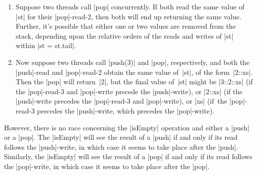 \begin{answerS}
\begin{enumerate}
\item Suppose two threads call |pop| concurrently.  If both read the same
  value of |st| for their |pop|-read-2,  then both will end up
  returning the same value.  Further, it's possible that either one or two
  values are removed from the stack, depending upon the relative orders of the
  reads and writes of |st| within |st = st.tail|.  

\item Now suppose two threads call |push(3)| and |pop|, respectively, and both
  the |push|-read and |pop|-read-2 obtain the same value of~|st|, of the
  form~|2::xs|.  Then the |pop| will return~|2|, but the final value of~|st|
  might be |3::2::xs| (if the |pop|-read-3 and |pop|-write precede the
  |push|-write), or |2::xs| (if the |push|-write precedes the |pop|-read-3 and
  |pop|-write), or |xs| (if~the |pop|-read-3 precedes the |push|-write, which
  precedes the |pop|-write).
\end{enumerate}

However, there is no race concerning the |isEmpty| operation and either a
|push| or a |pop|.  The |isEmpty| will see the result of a |push| if and only
if its read follows the |push|-write, in which case it seems to take place
after the |push|.  Similarly, the |isEmpty| will see the result of a |pop| if
and only if its read follows the |pop|-write, in which case it seems to take
place after the |pop|.
\end{answerS}
